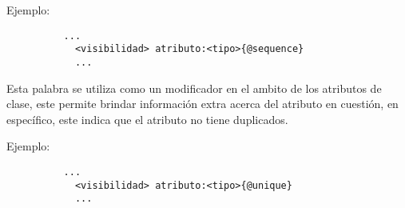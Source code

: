 \begin{description}[align=right,labelwidth=2.5cm]
	Ejemplo:
		\begin{lstlisting}
		  ...
			<visibilidad> atributo:<tipo>{@sequence}
			...
		\end{lstlisting}

\item [@unique] Esta palabra se utiliza como un modificador en el ambito de
	los atributos de clase, este permite brindar información extra acerca del
	atributo en cuestión, en específico, este indica que el atributo no tiene
	duplicados.

	Ejemplo:
		\begin{lstlisting}
		  ...
			<visibilidad> atributo:<tipo>{@unique}
			...
		\end{lstlisting}

\end{description}

